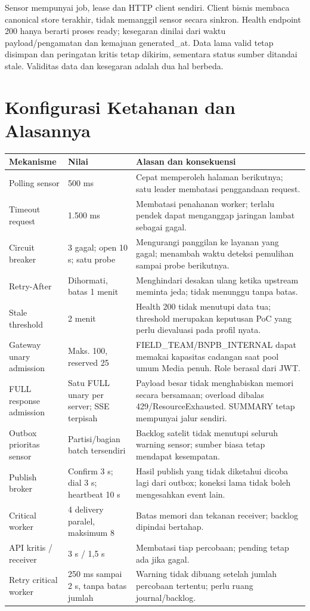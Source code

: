 Sensor mempunyai job, lease dan HTTP client sendiri. Client bisnis membaca canonical store terakhir, tidak memanggil sensor secara sinkron. Health endpoint 200 hanya berarti proses ready; kesegaran dinilai dari waktu payload/pengamatan dan kemajuan generated\_at. Data lama valid tetap disimpan dan peringatan kritis tetap dikirim, sementara status sumber ditandai stale. Validitas data dan kesegaran adalah dua hal berbeda.

\section{Konfigurasi Ketahanan dan Alasannya}
\begin{longtable}{@{}P{4.2cm}P{3cm}P{8.3cm}@{}}
\toprule Mekanisme & Nilai & Alasan dan konsekuensi\\\midrule\endhead
Polling sensor & 500 ms & Cepat memperoleh halaman berikutnya; satu leader membatasi penggandaan request.\\
Timeout request & 1.500 ms & Membatasi penahanan worker; terlalu pendek dapat menganggap jaringan lambat sebagai gagal.\\
Circuit breaker & 3 gagal; open 10 s; satu probe & Mengurangi panggilan ke layanan yang gagal; menambah waktu deteksi pemulihan sampai probe berikutnya.\\
Retry-After & Dihormati, batas 1 menit & Menghindari desakan ulang ketika upstream meminta jeda; tidak menunggu tanpa batas.\\
Stale threshold & 2 menit & Health 200 tidak menutupi data tua; threshold merupakan keputusan PoC yang perlu dievaluasi pada profil nyata.\\
Gateway unary admission & Maks. 100, reserved 25 & FIELD\_TEAM/BNPB\_INTERNAL dapat memakai kapasitas cadangan saat pool umum Media penuh. Role berasal dari JWT.\\
FULL response admission & Satu FULL unary per server; SSE terpisah & Payload besar tidak menghabiskan memori secara bersamaan; overload dibalas 429/ResourceExhausted. SUMMARY tetap mempunyai jalur sendiri.\\
Outbox prioritas sensor & Partisi/bagian batch tersendiri & Backlog satelit tidak menutupi seluruh warning sensor; sumber biasa tetap mendapat kesempatan.\\
Publish broker & Confirm 3 s; dial 3 s; heartbeat 10 s & Hasil publish yang tidak diketahui dicoba lagi dari outbox; koneksi lama tidak boleh mengesahkan event lain.\\
Critical worker & 4 delivery paralel, maksimum 8 & Batas memori dan tekanan receiver; backlog dipindai bertahap.\\
API kritis / receiver & 3 s / 1,5 s & Membatasi tiap percobaan; pending tetap ada jika gagal.\\
Retry critical worker & 250 ms sampai 2 s, tanpa batas jumlah & Warning tidak dibuang setelah jumlah percobaan tertentu; perlu ruang journal/backlog.\\\bottomrule
\end{longtable}
